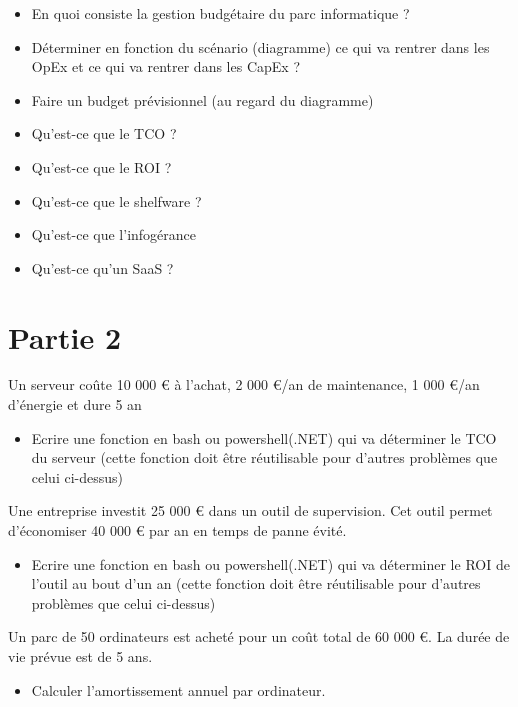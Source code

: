 \documentclass[12pt, letterpaper]{article}
\begin{document}
\begin{itemize}
    \item En quoi consiste la gestion budgétaire du parc informatique ? 
    \item Déterminer en fonction du scénario (diagramme) ce qui va rentrer dans les OpEx et ce qui va rentrer dans les CapEx ?
    \item Faire un budget prévisionnel (au regard du diagramme)
    \item Qu'est-ce que le TCO ?
    \item Qu'est-ce que le ROI ?
    \item Qu'est-ce que le shelfware ?
    \item Qu'est-ce que l'infogérance
    \item Qu'est-ce qu'un SaaS ?
\end{itemize}



\section{Partie 2}

\begin{tcolorbox}
    Un serveur coûte 10 000 € à l’achat, 2 000 €/an de maintenance, 1 000 €/an d’énergie
et dure 5 an
    \begin{itemize}
        \item Ecrire une fonction en bash ou powershell(.NET) qui va déterminer le TCO du serveur (cette fonction doit être réutilisable pour d'autres problèmes que celui ci-dessus)
    \end{itemize}
\end{tcolorbox}

\begin{tcolorbox}
    Une entreprise investit 25 000 € dans un outil de supervision.  
Cet outil permet d’économiser 40 000 € par an en temps de panne évité.  
 \begin{itemize}
        \item Ecrire une fonction en bash ou powershell(.NET) qui va déterminer le ROI de l'outil au bout d'un an (cette fonction doit être réutilisable pour d'autres problèmes que celui ci-dessus)
    \end{itemize}
\end{tcolorbox}

\begin{tcolorbox}
    Un parc de 50 ordinateurs est acheté pour un coût total de 60 000 €. La durée de vie prévue est
de 5 ans.
\begin{itemize}
    \item Calculer l’amortissement annuel par ordinateur.
\end{itemize}
\end{tcolorbox}
\end{document}
